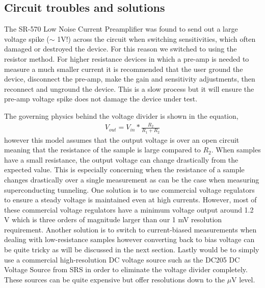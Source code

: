 \subsection{Circuit troubles and solutions}
The SR-570 Low Noise Current Preamplifier was found to send out a large voltage spike ($\sim$ 1V!) across the circuit when switching sensitivities, which often damaged or destroyed the device. For this reason we switched to using the resistor method. For higher resistance devices in which a pre-amp is needed to measure a much smaller current it is recommended that the user ground the device, disconnect the pre-amp, make the gain and sensitivity adjustments, then reconnect and unground the device. This is a slow process but it will ensure the pre-amp voltage spike does not damage the device under test.\par
The governing physics behind the voltage divider is shown in the equation,
\begin{align}
    V_{out} = V_{in}*\frac{R_{2}}{R_{1}+R_{2}}
\end{align}
however this model assumes that the output voltage is over an open circuit meaning that the resistance of the sample is large compared to $R_{2}$. When samples have a small resistance, the output voltage can change drastically from the expected value. This is especially concerning when the resistance of a sample changes drastically over a single measurement as can be the case when measuring superconducting tunneling. One solution is to use commercial voltage regulators to ensure a steady voltage is maintained even at high currents. However, most of these commercial voltage regulators have a minimum voltage output around 1.2 V which is three orders of magnitude larger than our 1 mV resolution requirement. Another solution is to switch to current-biased measurements when dealing with low-resistance samples however converting back to bias voltage can be quite tricky as will be discussed in the next section. Lastly would be to simply use a commercial high-resolution DC voltage source such as the DC205 DC Voltage Source from SRS in order to eliminate the voltage divider completely. These sources can be quite expensive but offer resolutions down to the $\mu$V level.\par 

